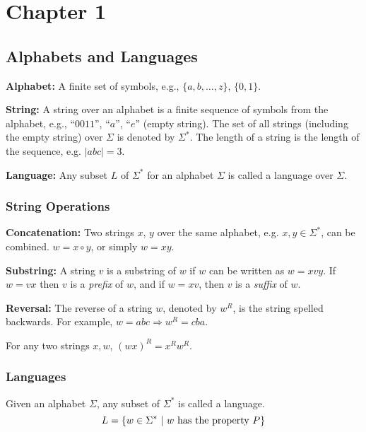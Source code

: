 \section{Chapter 1}

\begin{multicols}{2}
\setlength{\columnsep}{1.5cm}
\setlength{\columnseprule}{0.2pt}

\subsection{Alphabets and Languages}

\textbf{Alphabet:} A finite set of symbols, e.g., $\{a, b, \ldots, z\}$, $\{0, 1\}$.

\textbf{String:} A string over an alphabet is a finite sequence of symbols from the alphabet, e.g., ``$0011$'', ``$a$'', ``$e$'' (empty string). The set of all strings (including the empty string) over $\Sigma$ is denoted by $\Sigma^*$. The length of a string is the length of the sequence, e.g. $|abc| = 3$.

\textbf{Language:} Any subset $L$ of $\Sigma^*$ for an alphabet $\Sigma$ is called a language over $\Sigma$.

\subsubsection{String Operations}

\textbf{Concatenation:} Two strings $x$, $y$ over the same alphabet, e.g. $x, y \in \Sigma^*$, can be combined. $w = x \circ y$, or simply $w = xy$.

\textbf{Substring:} A string $v$ is a substring of $w$ if $w$ can be written as $w = xvy$. If $w = vx$ then $v$ is a \textit{prefix} of $w$, and if $w = xv$, then $v$ is a \textit{suffix} of $w$.

\textbf{Reversal:} The reverse of a string $w$, denoted by $w^R$, is the string spelled backwards. For example, $w = abc \Rightarrow w^R = cba$.

\begin{theorem}{}
  For any two strings $x, w$, $(wx)^R = x^Rw^R$.
\end{theorem}

\subsubsection{Languages}

Given an alphabet $\Sigma$, any subset of $\Sigma^*$ is called a language.
\begin{equation*}
  L = \left\{ w \in \Sigma^*\ |\ w \textnormal{ has the property } P \right\}
\end{equation*}


\end{multicols}
